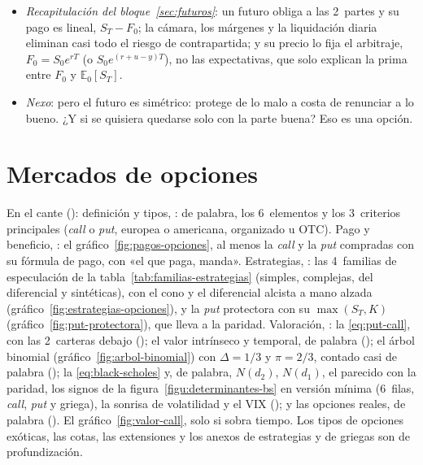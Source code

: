 \documentclass[11pt]{article}
\begin{document}
\begin{itemize}
\item \emph{Recapitulación del bloque~\ref{sec:futuros}}: un futuro obliga a las 2~partes y su pago es lineal, $S_T-F_0$; la cámara, los márgenes y la liquidación diaria eliminan casi todo el riesgo de contrapartida; y su precio lo fija el arbitraje, $F_0=S_0e^{rT}$ (o $S_0e^{(r+u-y)T}$), no las expectativas, que solo explican la prima entre $F_0$ y $\mathbb{E}_0[S_T]$.
\item \emph{Nexo}: pero el futuro es simétrico: protege de lo malo a costa de renunciar a lo bueno. ¿Y si se quisiera quedarse solo con la parte buena? Eso es una opción.
\end{itemize}

\section{Mercados de opciones}\label{sec:opciones}

\begin{notaopositor}
En el cante (): definición y tipos, : de palabra, los 6~elementos y los 3~criterios principales (\emph{call} o \emph{put}, europea o americana, organizado u OTC). Pago y beneficio, : el gráfico~\ref{fig:pagos-opciones}, al menos la \emph{call} y la \emph{put} compradas con su fórmula de pago, con «el que paga, manda». Estrategias, : las 4~familias de especulación de la tabla~\ref{tab:familias-estrategias} (simples, complejas, del diferencial y sintéticas), con el cono y el diferencial alcista a mano alzada (gráfico~\ref{fig:estrategias-opciones}), y la \emph{put} protectora con su $\max(S_T,K)$ (gráfico~\ref{fig:put-protectora}), que lleva a la paridad. Valoración, : la \eqref{eq:put-call}, con las 2~carteras debajo (); el valor intrínseco y temporal, de palabra (); el árbol binomial (gráfico~\ref{fig:arbol-binomial}) con $\Delta=1/3$ y $\pi=2/3$, contado casi de palabra (); la \eqref{eq:black-scholes} y, de palabra, $N(d_2)$, $N(d_1)$, el parecido con la paridad, los signos de la figura~\ref{figu:determinantes-bs} en versión mínima (6~filas, \emph{call}, \emph{put} y griega), la sonrisa de volatilidad y el VIX (); y las opciones reales, de palabra (). El gráfico~\ref{fig:valor-call}, solo si sobra tiempo. Los tipos de opciones exóticas, las cotas, las extensiones y los anexos de estrategias y de griegas son de profundización.
\end{notaopositor}
\end{document}
